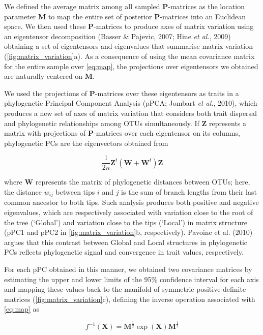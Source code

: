 \documentclass[12pt,twoside]{report}
\begin{document}
We defined the average matrix among all sampled $\mathbf{P}$-matrices as
the location parameter $\mathbf{M}$ to map the entire set of posterior
$\mathbf{P}$-matrices into an Euclidean space. We then used these
$\mathbf{P}$-matrices to produce axes of matrix variation using an
eigentensor decomposition (Basser \& Pajevic, 2007; Hine \emph{et al.},
2009) obtaining a set of eigentensors and eigenvalues that summarise
matrix variation (\autoref{fig:matrix_variation}a). As a consequence of
using the mean covariance matrix for the entire sample over
\autoref{eq:map}, the projections over eigentensors we obtained are
naturally centered on $\mathbf{M}$.

We used the projections of $\mathbf{P}$-matrices over these eigentensors
as traits in a phylogenetic Principal Component Analysis (pPCA; Jombart
\emph{et al.}, 2010), which produces a new set of axes of matrix
variation that considers both trait dispersal and phylogenetic
relationships among OTUs simultaneously. If $\mathbf{Z}$ represents a
matrix with projections of $\mathbf{P}$-matrices over each eigentensor
on its columns, phylogenetic PCs are the eigenvectors obtained from

\begin{equation}
\frac{1}{2n} \mathbf{Z}^t(\mathbf{W} + \mathbf{W}^t) \mathbf{Z}
\end{equation}

where $\mathbf{W}$ represents the matrix of phylogenetic distances
between OTUs; here, the distance $w_{ij}$ between tips $i$ and $j$ is
the sum of branch lengths from their last common ancestor to both tips.
Such analysis produces both positive and negative eigenvalues, which are
respectively associated with variation close to the root of the tree
(`Global') and variation close to the tips (`Local') in matrix structure
(pPC1 and pPC2 in \autoref{fig:matrix_variation}b, respectively).
Pavoine et al. (2010) argues that this contrast between Global and Local
structures in phylogenetic PCs reflects phylogenetic signal and
convergence in trait values, respectively.

For each pPC obtained in this manner, we obtained two covariance
matrices by estimating the upper and lower limits of the 95\% confidence
interval for each axis and mapping these values back to the manifold of
symmetric positive-definite matrices (\autoref{fig:matrix_variation}c),
defining the inverse operation associated with \autoref{eq:map} as

\begin{equation}
f^{-1}(\mathbf{X}) = \mathbf{M}^{\frac{1}{2}}\exp(\mathbf{X})\mathbf{M}^{\frac{1}{2}}
\label{eq:inv}
\end{equation}
\end{document}
